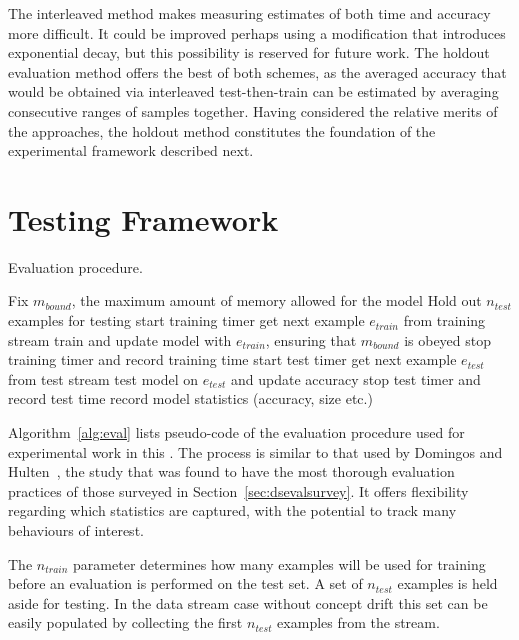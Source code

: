 The interleaved method makes measuring estimates of both time and accuracy more difficult. It could be improved perhaps using a modification that introduces exponential decay, but this possibility is reserved for future work. The holdout evaluation method offers the best of both schemes, as the averaged accuracy that would be obtained via interleaved test-then-train can be estimated by averaging consecutive ranges of samples together. Having considered the relative merits of the approaches, the holdout method constitutes the foundation of the experimental framework described next.

\section{Testing Framework}
\label{sec:framework}

\begin{algorithm}
\caption{Evaluation procedure.}
\begin{algorithmic}
\STATE Fix $m_{bound}$, the maximum amount of memory allowed for the model
\STATE Hold out $n_{test}$ examples for testing
\STATE start training timer
\STATE get next example $e_{train}$ from training stream
\STATE train and update model with $e_{train}$, ensuring that $m_{bound}$ is obeyed
\ENDFOR
\STATE stop training timer and record training time
\STATE start test timer
\STATE get next example $e_{test}$ from test stream
\STATE test model on $e_{test}$ and update accuracy
\ENDFOR
\STATE stop test timer and record test time
\STATE record model statistics (accuracy, size etc.)
\ENDWHILE
\end{algorithmic}
\label{alg:eval}
\end{algorithm}

Algorithm~\ref{alg:eval} lists pseudo-code of the evaluation procedure used for experimental work in this \thesisc. The process is similar to that used by Domingos and Hulten~\cite{vfdt}, the study that was found to have the most thorough evaluation practices of those surveyed in Section~\ref{sec:dsevalsurvey}. It offers flexibility regarding which statistics are captured, with the potential to track many behaviours of interest.

The $n_{train}$ parameter determines how many examples will be used for training before an evaluation is performed on the test set. A set of $n_{test}$ examples is held aside for testing. In the data stream case without concept drift this set can be easily populated by collecting the first $n_{test}$ examples from the stream.

